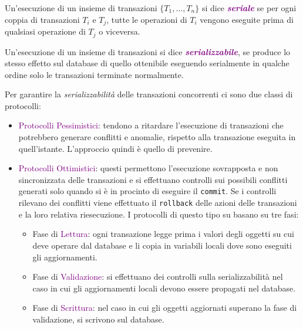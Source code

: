 \begin{definition}
    Un'esecuzione di un insieme di transazioni $\{T_1, \dots, T_n\}$ si dice
    \textbf{\emph{\textcolor{purple}{seriale}}} se per ogni coppia di transazioni
    $T_i$ e $T_j$, tutte le operazioni di $T_i$ vengono eseguite prima di qualsiasi operazione
    di $T_j$ o viceversa.
\end{definition}

\begin{definition}
    Un'esecuzione di un insieme di transazioni si dice \emph{\textbf{\textcolor{purple}{serializzabile}}},
    se produce lo stesso effetto sul database di quello ottenibile eseguendo serialmente in
    qualche ordine solo le transazioni terminate normalmente.
\end{definition}

Per garantire la \emph{serializzabilità} delle transazioni concorrenti ci sono due classi di protocolli:
\begin{itemize}
    \item \textcolor{purple}{Protocolli Pessimistici}: tendono a ritardare l'esecuzione di transazioni
        che potrebbero generare conflitti e anomalie, rispetto alla transazione eseguita in quell'istante.
        L'approccio quindi è quello di prevenire.
    \item \textcolor{purple}{Protocolli Ottimistici}: questi permettono l'esecuzione sovrapposta e non sincronizzata
        delle transazioni e si effettuano controlli sui possibili
        conflitti generati solo quando si è in procinto di eseguire il \verb|commit|.
        Se i controlli rilevano dei conflitti viene effettuato il \verb|rollback| delle
        azioni delle transazioni e la loro relativa riesecuzione.
        I protocolli di questo tipo su basano su tre fasi:
        \begin{itemize}
            \item Fase di \textcolor{purple}{Lettura}: ogni transazione legge prima i valori degli
                oggetti su cui deve operare dal database e li copia in variabili locali dove sono
                eseguiti gli aggiornamenti.
            \item Fase di \textcolor{purple}{Validazione}: si effettuano dei controlli sulla serializzabilità
                nel caso in cui gli aggiornamenti locali devono essere propagati nel database.
            \item Fase di \textcolor{purple}{Scrittura}: nel caso in cui gli oggetti aggiornati superano
                la fase di validazione, si scrivono sul database.
        \end{itemize}
\end{itemize}

